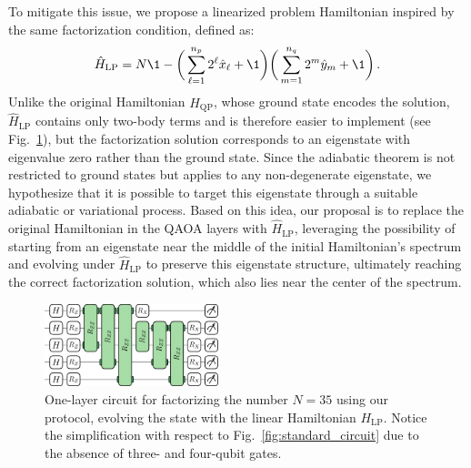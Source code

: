 To mitigate this issue, we propose a linearized problem Hamiltonian inspired by the same factorization condition, defined as:
\begin{equation}
	\hat{H}_\mathrm{LP} = N \1 - \bigg( \sum_{\ell=1}^{n_p} 2^\ell \hat{x}_\ell + \1 \bigg)
	\bigg( \sum_{m=1}^{n_q} 2^m \hat{y}_m + \1 \bigg)\,.
	\label{eq:linear_problem_hamiltonian}
\end{equation}
Unlike the original Hamiltonian $\hat{H}_\mathrm{QP}$, whose ground state encodes the solution, $\hat{H}_\mathrm{LP}$ contains only two-body terms and is therefore easier to implement (see Fig.~\ref{fig:linear_circuit_35.pdf}), but the factorization solution corresponds to an eigenstate with eigenvalue zero rather than the ground state. Since the adiabatic theorem is not restricted to ground states but applies to any non-degenerate eigenstate, we hypothesize that it is possible to target this eigenstate through a suitable adiabatic or variational process. Based on this idea, our proposal is to replace the original Hamiltonian in the QAOA layers with $\hat{H}_\mathrm{LP}$, leveraging the possibility of starting from an eigenstate near the middle of the initial Hamiltonian’s spectrum and evolving under $\hat{H}_\mathrm{LP}$ to preserve this eigenstate structure, ultimately reaching the correct factorization solution, which also lies near the center of the spectrum.

\begin{figure}[h]
    \centering
    \includegraphics[width=0.45\textwidth]{02-factorization/figs/linear_circuit_35.pdf}
    \caption{One-layer circuit for factorizing the number $N=35$ using our protocol, evolving the state with the linear Hamiltonian $H_{\mathrm{LP}}$. Notice the simplification with respect to Fig.~\ref{fig:standard_circuit}
    due to the absence of three- and four-qubit gates.}
    \label{fig:linear_circuit_35.pdf}
\end{figure}